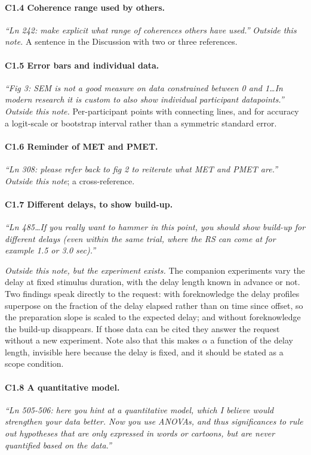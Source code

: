 \documentclass[a4paper,11pt]{article}
\newcommand{\1}{\mathbbm{1}}
\begin{document}
\paragraph{C1.4 Coherence range used by others.}
\emph{``Ln 242: make explicit what range of coherences others have used.''}
\emph{Outside this note.} A sentence in the Discussion with two or three references.

\paragraph{C1.5 Error bars and individual data.}
\emph{``Fig 3: SEM is not a good measure on data constrained between 0 and 1\ldots In
modern research it is custom to also show individual participant datapoints.''}
\emph{Outside this note.} Per-participant points with connecting lines, and for accuracy
a logit-scale or bootstrap interval rather than a symmetric standard error.

\paragraph{C1.6 Reminder of MET and PMET.}
\emph{``Ln 308: please refer back to fig 2 to reiterate what MET and PMET are.''}
\emph{Outside this note}; a cross-reference.

\paragraph{C1.7 Different delays, to show build-up.}
\emph{``Ln 485\ldots If you really want to hammer in this point, you should show
build-up for different delays (even within the same trial, where the RS can come at for
example 1.5 or 3.0 sec).''}

\emph{Outside this note, but the experiment exists.} The companion experiments vary the
delay at fixed stimulus duration, with the delay length known in advance or not. Two
findings speak directly to the request: with foreknowledge the delay profiles superpose
on the fraction of the delay elapsed rather than on time since offset, so the
preparation slope is scaled to the expected delay; and without foreknowledge the
build-up disappears. If those data can be cited they answer the request without a new
experiment. Note also that this makes $\alpha$ a function of the delay length, invisible
here because the delay is fixed, and it should be stated as a scope condition.

\paragraph{C1.8 A quantitative model.}
\emph{``Ln 505-506: here you hint at a quantitative model, which I believe would
strengthen your data better. Now you use ANOVAs, and thus significances to rule out
hypotheses that are only expressed in words or cartoons, but are never quantified based
on the data.''}
\end{document}
